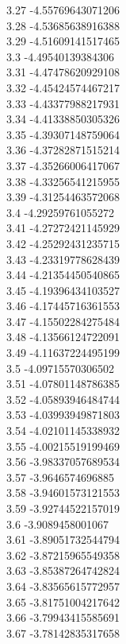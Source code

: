 {3.27	-4.55769643071206\\
3.28	-4.53685638916388\\
3.29	-4.51609141517465\\
3.3	-4.49540139384306\\
3.31	-4.47478620929108\\
3.32	-4.45424574467217\\
3.33	-4.43377988217931\\
3.34	-4.41338850305326\\
3.35	-4.39307148759064\\
3.36	-4.37282871515214\\
3.37	-4.35266006417067\\
3.38	-4.33256541215955\\
3.39	-4.31254463572068\\
3.4	-4.29259761055272\\
3.41	-4.27272421145929\\
3.42	-4.25292431235715\\
3.43	-4.23319778628439\\
3.44	-4.21354450540865\\
3.45	-4.19396434103527\\
3.46	-4.17445716361553\\
3.47	-4.15502284275484\\
3.48	-4.13566124722091\\
3.49	-4.11637224495199\\
3.5	-4.09715570306502\\
3.51	-4.07801148786385\\
3.52	-4.05893946484744\\
3.53	-4.03993949871803\\
3.54	-4.02101145338932\\
3.55	-4.00215519199469\\
3.56	-3.98337057689534\\
3.57	-3.9646574696885\\
3.58	-3.94601573121553\\
3.59	-3.92744522157019\\
3.6	-3.9089458001067\\
3.61	-3.89051732544794\\
3.62	-3.87215965549358\\
3.63	-3.85387264742824\\
3.64	-3.83565615772957\\
3.65	-3.81751004217642\\
3.66	-3.79943415585691\\
3.67	-3.78142835317658\\
}
